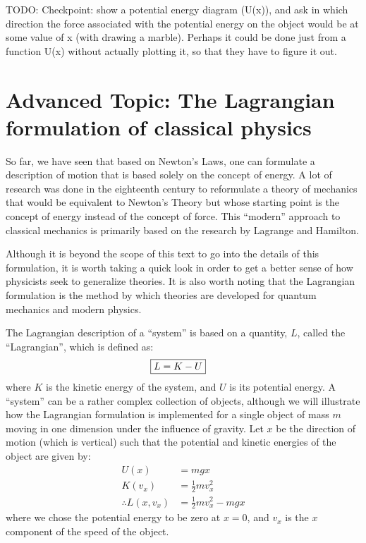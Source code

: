 TODO: Checkpoint: show a potential energy diagram (U(x)), and ask in which direction the force associated with the potential energy on the object would be at some value of x (with drawing a marble). Perhaps it could be done just from a function U(x) without actually plotting it, so that they have to figure it out.

\section{Advanced Topic: The Lagrangian formulation of classical physics}
So far, we have seen that based on Newton's Laws, one can formulate a description of motion that is based solely on the concept of energy. A lot of research was done in the eighteenth century to reformulate a theory of mechanics that would be equivalent to Newton's Theory but whose starting point is the concept of energy instead of the concept of force. This ``modern'' approach to classical mechanics is primarily based on the research by Lagrange and Hamilton. 

Although it is beyond the scope of this text to go into the details of this formulation, it is worth taking a quick look in order to get a better sense of how physicists seek to generalize theories. It is also worth noting that the Lagrangian formulation is the method by which theories are developed for quantum mechanics and modern physics. 

The Lagrangian description of a ``system'' is based on a quantity, $L$, called the ``Lagrangian'', which is defined as:
\begin{align}
\Aboxed{L = K - U}
\end{align}
where $K$ is the kinetic energy of the system, and $U$ is its potential energy. A ``system'' can be a rather complex collection of objects, although we will illustrate how the Lagrangian formulation is implemented for a single object of mass $m$ moving in one dimension under the influence of gravity. Let $x$ be the direction of motion (which is vertical) such that the potential and kinetic energies of the object are given by:
\begin{align*}
U(x) &= mgx\\
K(v_x) &= \frac{1}{2}mv_x^2\\
\therefore L(x,v_x) &= \frac{1}{2}mv_x^2 - mgx
\end{align*}
where we chose the potential energy to be zero at $x=0$, and $v_x$ is the $x$ component of the speed of the object.

